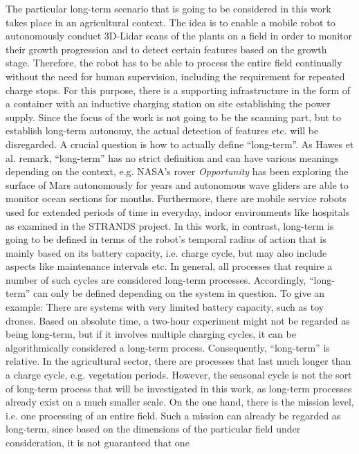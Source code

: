 \documentclass[english, master, expose, utf8]{base/thesis_KBS}
\begin{document}
The particular long-term scenario that is going to be considered in this work takes place in an agricultural context.
The idea is to enable a mobile robot to autonomously conduct 3D-Lidar scans of the plants on a field in order to monitor their growth progression and 
to detect certain features based on the growth stage. Therefore, the robot has to be able to process the entire field continually without the need for human supervision,
including the requirement for repeated charge stops. For this purpose, there is a supporting infrastructure in the form of a container with an inductive charging station on site
establishing the power supply. Since the focus of the work is not going to be the scanning part, but to establish long-term autonomy, 
the actual detection of features etc. will be disregarded.
A crucial question is how to actually define ``long-term''. As Hawes et al. remark, ``long-term'' has no strict definition and can have various meanings depending
on the context, e.g. NASA's rover \textit{Opportunity} has been exploring the surface of Mars autonomously for years and autonomous wave gliders are able to monitor
ocean sections for months. \cite{Hawes:2017} Furthermore, there are mobile service robots used for extended periods of time in everyday, indoor environments like hospitals 
as examined in the STRANDS project.
In this work, in contrast, long-term is going to be defined in terms of the robot's temporal radius of action that is mainly based on its battery capacity, i.e. charge cycle,
but may also include aspects like maintenance intervals etc. In general, all processes that require a number of such cycles are considered long-term processes.
Accordingly, ``long-term'' can only be defined depending on the system in question. To give an example: There are systems with very limited battery capacity, 
such as toy drones. Based on absolute time, a two-hour experiment might not be regarded as being long-term, but if it involves multiple charging cycles, it can be 
algorithmically considered a long-term process. Consequently, ``long-term'' is relative.\newline
In the agricultural sector, there are processes that last much longer than a charge cycle, e.g. vegetation periods.
However, the seasonal cycle is not the sort of long-term process that will be investigated in this work, as long-term processes already exist on a much smaller scale.
On the one hand, there is the mission level, i.e. one processing of an entire field. 
Such a mission can already be regarded as long-term, since based on the dimensions of the particular field under consideration, it is not guaranteed that one
\end{document}
